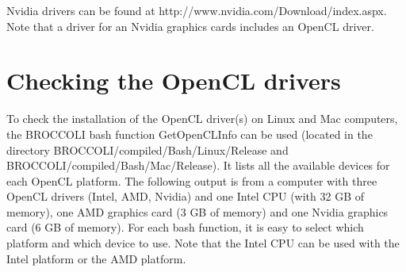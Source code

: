 Nvidia drivers can be found at http://www.nvidia.com/Download/index.aspx. Note that a driver for an Nvidia graphics cards includes an OpenCL driver. 

\section{Checking the OpenCL drivers}

To check the installation of the OpenCL driver(s) on Linux and Mac computers, the BROCCOLI bash function GetOpenCLInfo can be used (located in the directory BROCCOLI/compiled/Bash/Linux/Release and BROCCOLI/compiled/Bash/Mac/Release). It lists all the available devices for each OpenCL platform. The following output is from a computer with three OpenCL drivers (Intel, AMD, Nvidia) and one Intel CPU (with 32 GB of memory), one AMD graphics card (3 GB of memory) and one Nvidia graphics card (6 GB of memory). For each bash function, it is easy to select which platform and which device to use. Note that the Intel CPU can be used with the Intel platform or the AMD platform. 

